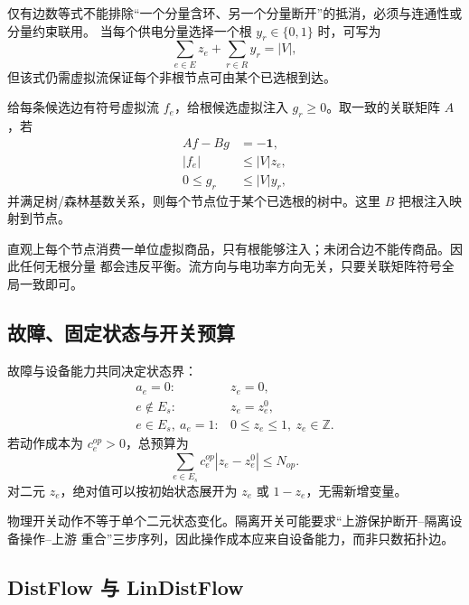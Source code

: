 仅有边数等式不能排除“一个分量含环、另一个分量断开”的抵消，必须与连通性或分量约束联用。
当每个供电分量选择一个根 $y_r\in\{0,1\}$ 时，可写为
\begin{equation}
\sum_{e\in E}z_e+\sum_{r\in R}y_r=|V|,
\end{equation}
但该式仍需虚拟流保证每个非根节点可由某个已选根到达。

\begin{proposition}[单商品流的连通性证书]
给每条候选边有符号虚拟流 $f_e$，给根候选虚拟注入 $g_r\ge0$。取一致的关联矩阵 $A$，若
\begin{align}
A f-Bg&=-\mathbf 1,\\
|f_e|&\le |V|z_e,\\
0\le g_r&\le |V|y_r,
\end{align}
并满足树/森林基数关系，则每个节点位于某个已选根的树中。这里 $B$ 把根注入映射到节点。
\end{proposition}

直观上每个节点消费一单位虚拟商品，只有根能够注入；未闭合边不能传商品。因此任何无根分量
都会违反平衡。流方向与电功率方向无关，只要关联矩阵符号全局一致即可。

\subsection{故障、固定状态与开关预算}

故障与设备能力共同决定状态界：
\begin{equation}
\begin{array}{ll}
a_e=0:&z_e=0,\\
e\notin E_s:&z_e=z_e^0,\\
e\in E_s,\ a_e=1:&0\le z_e\le1,\ z_e\in\mathbb Z.
\end{array}
\end{equation}
若动作成本为 $c_e^{op}>0$，总预算为
\begin{equation}
\sum_{e\in E_s}c_e^{op}|z_e-z_e^0|\le N_{op}.
\end{equation}
对二元 $z_e$，绝对值可以按初始状态展开为 $z_e$ 或 $1-z_e$，无需新增变量。

物理开关动作不等于单个二元状态变化。隔离开关可能要求“上游保护断开--隔离设备操作--上游
重合”三步序列，因此操作成本应来自设备能力，而非只数拓扑边。

\subsection{DistFlow 与 LinDistFlow}

